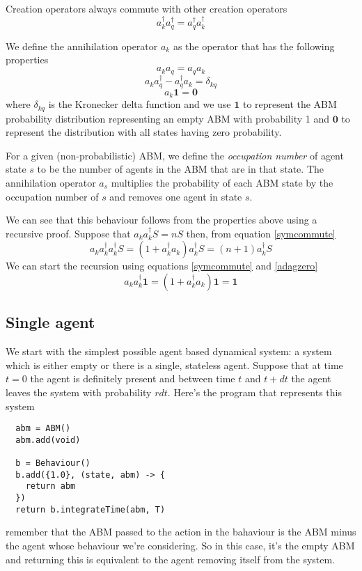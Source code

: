 \documentclass[letterpaper,twocolumn,10pt]{article}
\begin{document}
Creation operators always commute with other creation operators
\begin{equation}
a_k^\dag a_q^\dag = a_q^\dag a_k^\dag
\label{acommute}
\end{equation}

We define the annihilation operator $a_k$ as the operator that has the following properties
\begin{equation}
a_k a_q = a_q a_k
\label{ccommute}
\end{equation}
\begin{equation}
a_k a_q^\dag - a_q^\dag a_k = \delta_{kq}
\label{symcommute}
\end{equation}
\begin{equation}
a_k\mathbf{1} = \mathbf{0}
\label{adagzero} 
\end{equation}
where $\delta_{kq}$ is the Kronecker delta function and we use $\mathbf{1}$ to represent the ABM probability distribution representing an empty ABM with probability 1 and $\mathbf{0}$ to represent the distribution with all states having zero probability.

For a given (non-probabilistic) ABM, we define the \textit{occupation number} of agent state $s$ to be the number of agents in the ABM that are in that state. The annihilation operator $a_s$ multiplies the probability of each ABM state by the occupation number of $s$ and removes one agent in state $s$.

We can see that this behaviour follows from the properties above using a recursive proof. Suppose that $a_k a_k^\dag S = nS$ then, from equation \ref{symcommute}
\[
a_k a_k^\dag a_k^\dag S = (1 + a_k^\dag a_k)a_k^\dag S = (n+1)a_k^\dag S
\]
We can start the recursion using equations \ref{symcommute} and \ref{adagzero}
\[
a_k a_k^\dag \mathbf{1} = (1 + a_k^\dag a_k)\mathbf{1} = \mathbf{1}
\]

\subsection{Single agent}
We start with the simplest possible agent based dynamical system: a system which is either empty or there is a single, stateless agent. Suppose that at time $t=0$ the agent is definitely present and between time $t$ and $t+dt$ the agent leaves the system with probability $rdt$. Here's the program that represents this system
\begin{verbatim}
  abm = ABM()
  abm.add(void)
  
  b = Behaviour()
  b.add({1.0}, (state, abm) -> {
    return abm
  })
  return b.integrateTime(abm, T)
\end{verbatim}
remember that the ABM passed to the action in the bahaviour is the ABM minus the agent whose behaviour we're considering. So in this case, it's the empty ABM and returning this is equivalent to the agent removing itself from the system.
\end{document}
